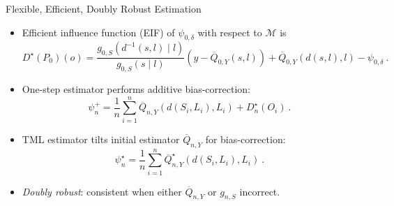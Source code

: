 \documentclass{beamer}
\begin{document}

\begin{frame}[c]{Flexible, Efficient, Doubly Robust Estimation}

\begin{center}
\begin{itemize}
  \itemsep8pt
  \item Efficient influence function (EIF) of $\psi_{0, \delta}$ with respect to
    $\mathcal{M}$ is
    \begin{equation*}
      D^{\star}(P_0)(o) = \frac{g_{0,S}(d^{-1}(s,l) \mid l)}
      {g_{0,S}(s \mid l)} ({y - \overline{Q}_{0,Y}(s,l)}) +
      \overline{Q}_{0,Y}(d(s,l), l) - \psi_{0,\delta} \ .
    \end{equation*}
  \item One-step estimator performs additive bias-correction:
    \begin{equation*}\label{tmle}
        \psi_n^{+} = \frac{1}{n} \sum_{i = 1}^n \overline{Q}_{n,Y}(d(S_i, L_i),
        L_i) + D^{\star}_n(O_i) \ .
      \end{equation*}
  \item TML estimator tilts initial estimator $\overline{Q}_{n,Y}$ for
    bias-correction:
    \begin{equation*}\label{tmle}
      \psi_n^{\star} = \frac{1}{n} \sum_{i = 1}^n
      \overline{Q}_{n,Y}^{\star}(d(S_i, L_i), L_i) \ .
      \end{equation*}
  \item \textit{Doubly robust}: consistent when either $\overline{Q}_{n,Y}$ or
   $g_{n,S}$ incorrect.
\end{itemize}
\end{center}


\end{frame}
\end{document}

